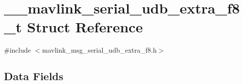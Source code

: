 \hypertarget{struct____mavlink__serial__udb__extra__f8__t}{\section{\+\_\+\+\_\+mavlink\+\_\+serial\+\_\+udb\+\_\+extra\+\_\+f8\+\_\+t Struct Reference}
\label{struct____mavlink__serial__udb__extra__f8__t}
}


{\ttfamily \#include $<$mavlink\+\_\+msg\+\_\+serial\+\_\+udb\+\_\+extra\+\_\+f8.\+h$>$}

\subsection*{Data Fields}
